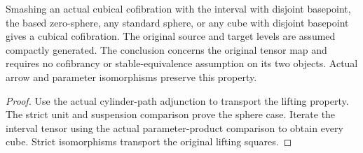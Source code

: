 \begin{proposition}
  \label{prop:actual-parameter-smash-cofibrations}
  \leanok
  Smashing an actual cubical cofibration with the interval with disjoint basepoint, the based zero-sphere, any standard sphere, or any cube with disjoint basepoint gives a cubical cofibration. The original source and target levels are assumed compactly generated. The conclusion concerns the original tensor map and requires no cofibrancy or stable-equivalence assumption on its two objects. Actual arrow and parameter isomorphisms preserve this property.
\end{proposition}
\begin{proof}
  Use the actual cylinder-path adjunction to transport the lifting property. The strict unit and suspension comparison prove the sphere case. Iterate the interval tensor using the actual parameter-product comparison to obtain every cube. Strict isomorphisms transport the original lifting squares.
  \leanok
\end{proof}


